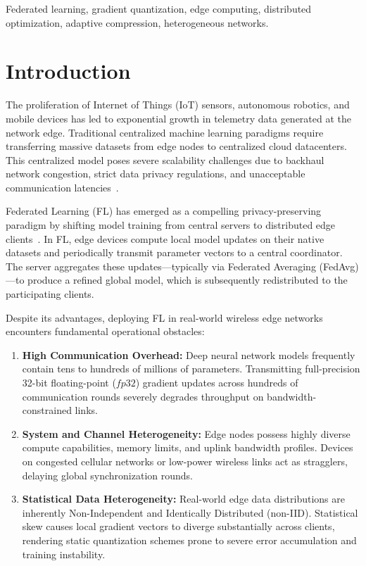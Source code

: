 \documentclass[conference]{IEEEtran}
\begin{document}
\begin{IEEEkeywords}
Federated learning, gradient quantization, edge computing, distributed optimization, adaptive compression, heterogeneous networks.
\end{IEEEkeywords}

\section{Introduction}
The proliferation of Internet of Things (IoT) sensors, autonomous robotics, and mobile devices has led to exponential growth in telemetry data generated at the network edge. Traditional centralized machine learning paradigms require transferring massive datasets from edge nodes to centralized cloud datacenters. This centralized model poses severe scalability challenges due to backhaul network congestion, strict data privacy regulations, and unacceptable communication latencies~\cite{mcmahan2017communication, kairouz2021advances}.

Federated Learning (FL) has emerged as a compelling privacy-preserving paradigm by shifting model training from central servers to distributed edge clients~\cite{li2020federated}. In FL, edge devices compute local model updates on their native datasets and periodically transmit parameter vectors to a central coordinator. The server aggregates these updates---typically via Federated Averaging (FedAvg)---to produce a refined global model, which is subsequently redistributed to the participating clients.

Despite its advantages, deploying FL in real-world wireless edge networks encounters fundamental operational obstacles:
\begin{enumerate}
    \item \textbf{High Communication Overhead:} Deep neural network models frequently contain tens to hundreds of millions of parameters. Transmitting full-precision 32-bit floating-point ($fp32$) gradient updates across hundreds of communication rounds severely degrades throughput on bandwidth-constrained links.
    \item \textbf{System and Channel Heterogeneity:} Edge nodes possess highly diverse compute capabilities, memory limits, and uplink bandwidth profiles. Devices on congested cellular networks or low-power wireless links act as stragglers, delaying global synchronization rounds.
    \item \textbf{Statistical Data Heterogeneity:} Real-world edge data distributions are inherently Non-Independent and Identically Distributed (non-IID). Statistical skew causes local gradient vectors to diverge substantially across clients, rendering static quantization schemes prone to severe error accumulation and training instability.
\end{enumerate}
\end{document}
